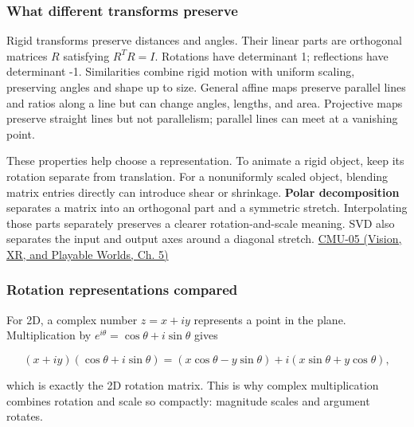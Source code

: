 \subsubsection{What different transforms preserve}\label{03-visual-computing-i-ch001-what-different-transforms-preserve}

\hypertarget{03-visual-computing-i-ch001-what-different-transforms-preserve}{}

Rigid transforms preserve distances and angles. Their linear parts are orthogonal matrices \(R\) satisfying \(R^TR=I\). Rotations have determinant 1; reflections have determinant -1. Similarities combine rigid motion with uniform scaling, preserving angles and shape up to size. General affine maps preserve parallel lines and ratios along a line but can change angles, lengths, and area. Projective maps preserve straight lines but not parallelism; parallel lines can meet at a vanishing point.

These properties help choose a representation. To animate a rigid object, keep its rotation separate from translation. For a nonuniformly scaled object, blending matrix entries directly can introduce shear or shrinkage. \textbf{Polar decomposition} separates a matrix into an orthogonal part and a symmetric stretch. Interpolating those parts separately preserves a clearer rotation-and-scale meaning. SVD also separates the input and output axes around a diagonal stretch. \href{../07-Vision-XR-and-Playable-Worlds/main.pdf\#nameddest=04-visual-computing-ii-ch036-cmu-05---spatial-transformations}{CMU-05 (Vision, XR, and Playable Worlds, Ch. 5)}

\subsubsection{Rotation representations compared}\label{03-visual-computing-i-ch001-rotation-representations-compared}

\hypertarget{03-visual-computing-i-ch001-rotation-representations-compared}{}

For 2D, a complex number \(z=x+iy\) represents a point in the plane. Multiplication by \(e^{i\theta}=\cos\theta+i\sin\theta\) gives

\[
(x+iy)(\cos\theta+i\sin\theta)=(x\cos\theta-y\sin\theta)+i(x\sin\theta+y\cos\theta),
\]

which is exactly the 2D rotation matrix. This is why complex multiplication combines rotation and scale so compactly: magnitude scales and argument rotates.

